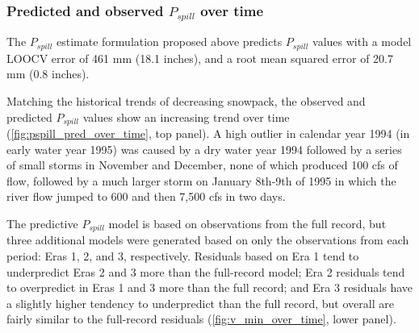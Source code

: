 \documentclass[hess, manuscript]{copernicus}
\begin{document}
\subsubsection{\texorpdfstring{Predicted and observed \(P_{spill}\) over
time}{Predicted and observed P\_\{spill\} over time}}

The \(P_{spill}\) estimate formulation proposed above predicts
\(P_{spill}\) values with a model LOOCV error of 461 mm (18.1 inches),
and a root mean squared error of 20.7 mm (0.8 inches).

Matching the historical trends of decreasing snowpack, the observed and
predicted \(P_{spill}\) values show an increasing trend over time
(\autoref{fig:pspill_pred_over_time}, top panel). A high outlier in
calendar year 1994 (in early water year 1995) was caused by a dry water
year 1994 followed by a series of small storms in November and December,
none of which produced 100 cfs of flow, followed by a much larger storm
on January 8th-9th of 1995 in which the river flow jumped to 600 and
then 7,500 cfs in two days.

The predictive \(P_{spill}\) model is based on observations from the
full record, but three additional models were generated based on only
the observations from each period: Eras 1, 2, and 3, respectively.
Residuals based on Era 1 tend to underpredict Eras 2 and 3 more than the
full-record model; Era 2 residuals tend to overpredict in Eras 1 and 3
more than the full record; and Era 3 residuals have a slightly higher
tendency to underpredict than the full record, but overall are fairly
similar to the full-record residuals (\autoref{fig:v_min_over_time},
lower panel).
\end{document}
